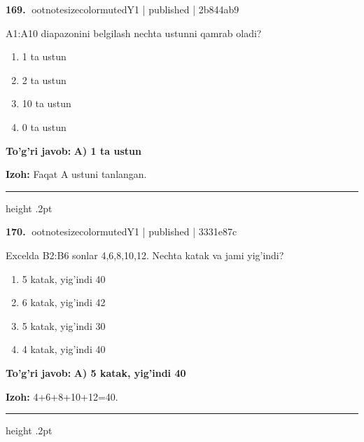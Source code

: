 \documentclass[10pt,a4paper]{article}
\begin{document}
\textbf{\color{ink}169.} {ootnotesizecolor{muted}Y1 | published | 2b844ab9}
\par
A1:A10 diapazonini belgilash nechta ustunni qamrab oladi?
\begin{enumerate}[label=\Alph*),leftmargin=9mm]
\item 1 ta ustun
\item 2 ta ustun
\item 10 ta ustun
\item 0 ta ustun
\end{enumerate}
\begin{tcolorbox}[enhanced,breakable,colback=teal!4,colframe=teal!55!black,boxrule=0.45pt,arc=1.2mm,left=2.8mm,right=2.8mm,top=2mm,bottom=2mm]
\textbf{\color{teal}To'g'ri javob:} \textbf{A) 1 ta ustun}
\par\smallskip
\textbf{Izoh:} Faqat A ustuni tanlangan.
\end{tcolorbox}
\vspace{2mm}\hrule height .2pt\vspace{2mm}

\textbf{\color{ink}170.} {ootnotesizecolor{muted}Y1 | published | 3331e87c}
\par
Excelda B2:B6 sonlar 4,6,8,10,12. Nechta katak va jami yig'indi?
\begin{enumerate}[label=\Alph*),leftmargin=9mm]
\item 5 katak, yig'indi 40
\item 6 katak, yig'indi 42
\item 5 katak, yig'indi 30
\item 4 katak, yig'indi 40
\end{enumerate}
\begin{tcolorbox}[enhanced,breakable,colback=teal!4,colframe=teal!55!black,boxrule=0.45pt,arc=1.2mm,left=2.8mm,right=2.8mm,top=2mm,bottom=2mm]
\textbf{\color{teal}To'g'ri javob:} \textbf{A) 5 katak, yig'indi 40}
\par\smallskip
\textbf{Izoh:} 4+6+8+10+12=40.
\end{tcolorbox}
\vspace{2mm}\hrule height .2pt\vspace{2mm}
\end{document}

